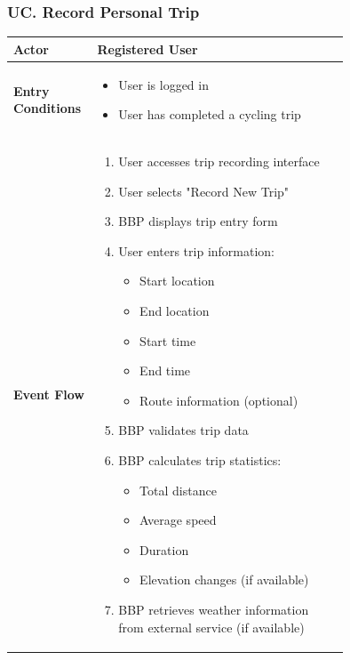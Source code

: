 \subsubsection*{UC\cuc . Record Personal Trip}
\begin{center}
    \begin{longtable}{|l|p{0.75\linewidth}|}
        \hline
        \textbf{Actor}            & Registered User \\
        \hline
        \textbf{Entry Conditions} & 
        \begin{itemize}
            \item User is logged in
            \item User has completed a cycling trip
        \end{itemize} \\
        \hline
        \textbf{Event Flow}       & 
        \begin{enumerate}
            \item User accesses trip recording interface
            \item User selects "Record New Trip"
            \item BBP displays trip entry form
            \item User enters trip information:
            \begin{itemize}
                \item Start location
                \item End location
                \item Start time
                \item End time
                \item Route information (optional)
            \end{itemize}
            \item BBP validates trip data
            \item BBP calculates trip statistics:
            \begin{itemize}
                \item Total distance
                \item Average speed
                \item Duration
                \item Elevation changes (if available)
            \end{itemize}
            \item BBP retrieves weather information from external service (if available)

\end{enumerate}
\end{longtable}
\end{center}
